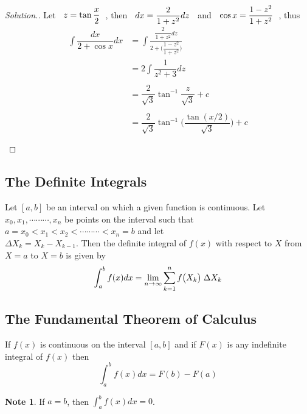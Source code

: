 \documentclass[11pt,a4paper]{article}
\theoremstyle{definition}
\newtheorem*{note}{Note}
\newenvironment{solution}
  {\renewcommand{\qedsymbol}{}\begin{proof}[\textit{Solution}.]}
  {\end{proof}}
\begin{document}
\begin{solution}


Let $\hspace{0.2cm} z = \tan \dfrac{x}{2}\hspace{0.2cm}$, then $\hspace{0.2cm} dx = \dfrac{2}{1 + z^2}dz\hspace{0.2cm}$ and $\hspace{0.2cm} \cos x = \dfrac{1 - z^2}{1 + z^2}\hspace{0.2cm}$, thus
\begin{align*}
\int \dfrac{dx}{2 + \cos x}dx & = \int \frac{\dfrac{2}{1 + z^2}dz}{2 + \Bigg(\dfrac{1 - z^2}{1 + z^2}\Bigg)}\\
& = 2 \int \dfrac{1}{z^2 + 3}dz\\\\
& = \dfrac{2}{\sqrt{3}}\tan^{-1}\dfrac{z}{\sqrt{3}} + c\\\\
& = \dfrac{2}{\sqrt{3}}\tan^{-1}\Bigg(\dfrac{\tan (x/2)}{\sqrt{3}}\Bigg) + c\\\\
\end{align*}
\end{solution}

\subsection{The Definite Integrals}
Let $[a,b]$ be an interval on which a given function is continuous. Let $x_0, x_1 , \cdots\cdots\cdots , x_n$ be points on the interval such that $a = x_0 < x_1< x_2<\cdots\cdots\cdots < x_n = b$ and let\\ $\Delta X_k = X_k - X_{k -1}$. Then the definite integral of $f(x)$ with respect to $X$  from $X  = a$ to $X = b$ is given by $$\int^b_a f(x) dx = \lim\limits_{n \rightarrow \infty} \sum^n_{k = 1} f\big(X_k\big) \hspace{0.1cm} \Delta X_k$$


\subsection{The Fundamental Theorem of Calculus}
If $f(x)$ is continuous on the interval $[a,b]$ and if $F(x)$ is any indefinite integral of $f(x)$ then $$\int^b_a f(x) dx = F(b) - F(a)$$


\begin{note}


If $a = b$, then $\displaystyle{\int^b_a f(x) dx = 0}$.
\end{note}
\end{document}
